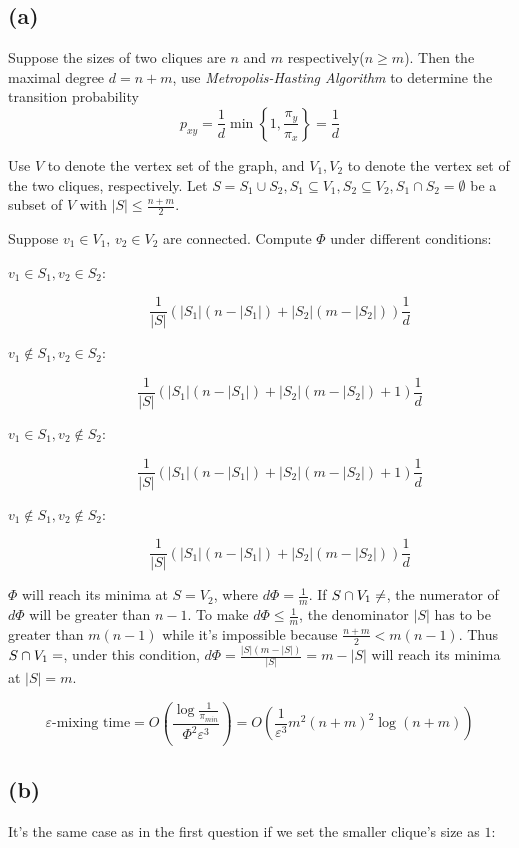 \documentclass[paper=a4, fontsize=11pt]{scrartcl} %
\numberwithin{equation}{section} %
\numberwithin{figure}{section} %
\numberwithin{table}{section} %
\begin{document}
\subsection*{(a)}
Suppose the sizes of two cliques are $n$ and $m$ respectively($n \geq m$). Then the maximal degree $d = n + m$, use {\it Metropolis-Hasting Algorithm} to determine the transition probability $$p_{xy} = \frac{1}{d}\min\left\{1, \frac{\pi_y}{\pi_x}\right\} = \frac{1}{d}$$

Use $V$ to denote the vertex set of the graph, and $V_1, V_2$ to denote the vertex set of the two cliques, respectively. Let $S = S_1 \cup S_2, S_1 \subseteq V_1, S_2 \subseteq V_2, S_1 \cap S_2 = \emptyset$ be a subset of $V$ with $|S| \leq \frac{n+m}{2}$.

Suppose $v_1\in V_1$, $v_2\in V_2$ are connected. Compute $\Phi$ under different conditions:
\begin{description}
	\item[$v_1 \in S_1, v_2 \in S_2$:] $$\frac{1}{|S|} \left(|S_1|(n - |S_1|) + |S_2|(m - |S_2|)\right) \frac{1}{d}$$
	\item[$v_1 \not\in S_1, v_2 \in S_2$:] $$\frac{1}{|S|} \left(|S_1|(n - |S_1|) + |S_2|(m - |S_2|) + 1\right) \frac{1}{d}$$
	\item[$v_1 \in S_1, v_2 \not\in S_2$:] $$\frac{1}{|S|} \left(|S_1|(n - |S_1|) + |S_2|(m - |S_2|) + 1\right) \frac{1}{d}$$
	\item[$v_1 \not\in S_1, v_2 \not\in S_2$:] $$\frac{1}{|S|} \left(|S_1|(n - |S_1|)  + |S_2|(m - |S_2|)\right) \frac{1}{d}$$
\end{description}

$\Phi$ will reach its minima at $S = V_2$, where $d\Phi = \frac{1}{m}$. If $S\cap V_1 \not= \empty$, the numerator of $d\Phi$ will be greater than $n - 1$. To make $d\Phi \leq \frac{1}{m}$, the denominator $|S|$ has to be greater than $m(n-1)$ while it's impossible because $\frac{n+m}{2} < m(n-1)$. Thus $S \cap V_1 = \empty$, under this condition, $d\Phi = \frac{|S|(m - |S|)}{|S|} = m - |S|$ will reach its minima at $|S| = m$.

$$\varepsilon\textrm{-mixing time} =  O\left(\frac{\log \frac{1}{\pi_{min}}}{\Phi^2 \varepsilon^3}\right) = O\left(\frac{1}{\varepsilon^3}m^2(n+m)^2 \log(n+m)\right)$$

\subsection*{(b)}
It's the same case as in the first question if we set the smaller clique's size as $1$:
\end{document}

